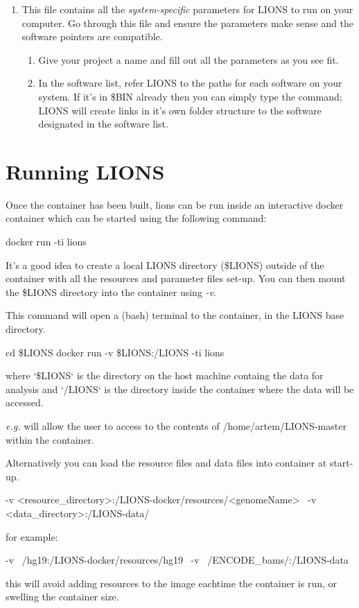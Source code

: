 \documentclass[11pt]{scrartcl}
\begin{document}
\begin{enumerate}
\item This file contains all the \textit{system-specific} parameters for LIONS to run on your computer. Go through this file and ensure the parameters make sense and the software pointers are compatible.
\begin{enumerate}
\item Give your project a name and fill out all the parameters as you see fit.
\item In the software list, refer LIONS to the paths for each software on your system. If it's in \$BIN already then you can simply type the command; LIONS will create links in it's own folder structure to the software designated in the software list.
\end{enumerate}
\end{enumerate}

\clearpage




\section{Running LIONS}
\label{lions_run}

Once the container has been built, lions can be run inside an interactive docker container
which can be started using the following command:

\begin{bash}
docker run -ti lions
\end{bash}

It's a good idea to create a local LIONS directory (\$LIONS) outside of the container with all the resources and parameter files set-up. You can then mount the \$LIONS directory into the container using \textit{-v}.

This command will open a (bash) terminal to the container, in the LIONS base directory.
 
\begin{bash}
cd \$LIONS
docker run -v \$LIONS:/LIONS -ti lions
\end{bash}

where `\$LIONS` is the directory on the host machine containg the data for analysis and `/LIONS` is the directory inside the container where the data will be accessed.

\textit{e.g.}  will allow the user to access to the contents of /home/artem/LIONS-master within the container.

\begin{framed}
Alternatively you can load the resource files and data files into container at start-up.

\begin{bash}
-v <resource_directory>:/LIONS-docker/resources/<genomeName> \
-v <data_directory>:/LIONS-data/
\end{bash}
for example:
\begin{bash}
-v ~/hg19:/LIONS-docker/resources/hg19 \
-v ~/ENCODE_bams/:/LIONS-data
\end{bash}

this will avoid adding resources to the image eachtime the container is run, or swelling the container size.
\end{framed}
\end{document}
